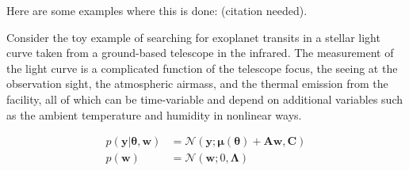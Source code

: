 \documentclass[modern]{rnaastex}
\newcommand{\bvec}[1]{{\ensuremath{\boldsymbol{#1}}}}
\newcommand{\citeme}{{\color{red}(citation needed)}}
\begin{document}
Here are some examples where this is done: \citeme.
\citep{Luger:2017,Luger:2016}

Consider the toy example of searching for exoplanet transits in a stellar
light curve taken from a ground-based telescope in the infrared.
The measurement of the light curve is a complicated function of the telescope
focus, the seeing at the observation sight, the atmospheric airmass, and the
thermal emission from the facility, all of which can be time-variable and
depend on additional variables such as the ambient temperature and humidity
in nonlinear ways.

\begin{align}
p(\bvec{y} | \bvec{\theta}, \bvec{w}) &=
    \mathcal{N}(\bvec{y};
                \bvec{\mu}(\bvec{\theta}) + \bvec{A}\bvec{w},
                \bvec{C})
                \nonumber\\
%
p(\bvec{w}) &= \mathcal{N}(\bvec{w}; 0, \bvec{\Lambda}) \nonumber
\end{align}
\end{document}
